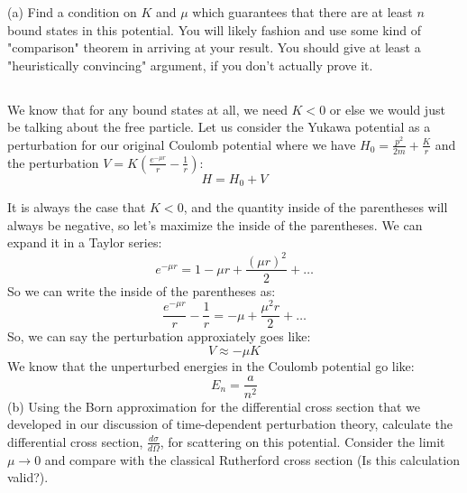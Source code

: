 \documentclass[12pt]{article}
\begin{document}
(a) Find a condition on $K$ and $\mu$ which guarantees that there are at least $n$ bound states in this potential. You will likely fashion and use some kind of "comparison" theorem in arriving at your result. You should give at least a "heuristically convincing" argument, if you don't actually prove it.
\subsection{}
We know that for any bound states at all, we need $K<0$ or else we would just be talking about the free particle. Let us consider the Yukawa potential as a perturbation for our original Coulomb potential where we have $H_0 = \frac{p^2}{2m} + \frac{K}{r}$ and the perturbation $V= K\left(\frac{e^{- \mu r}}{r} - \frac{1}{r}\right)$:
\begin{equation}
  H = H_0 + V
\end{equation}

It is always the case that $K<0$, and the quantity inside of the parentheses will always be negative, so let's maximize the inside of the parentheses. We can expand it in a Taylor series:
\begin{equation}
  e^{-\mu r} = 1 - \mu r + \frac{(\mu r)^2}{2} + \ldots
\end{equation}
So we can write the inside of the parentheses as:
\begin{equation}
  \frac{e^{-\mu r}}{r} - \frac{1}{r} = -\mu + \frac{\mu^2 r}{2} + \ldots
\end{equation}
So, we can say the perturbation approxiately goes like:
\begin{equation}
  V \approx -\mu K
\end{equation}
We know that the unperturbed energies in the Coulomb potential go like:
\begin{equation}
  E_n = \frac{a}{n^2}
\end{equation}
(b) Using the Born approximation for the differential cross section that we developed in our discussion of time-dependent perturbation theory, calculate the differential cross section, $\frac{d \sigma}{d \Omega}$, for scattering on this potential. Consider the limit $\mu \rightarrow 0$ and compare with the classical Rutherford cross section (Is this calculation valid?).
\end{document}
